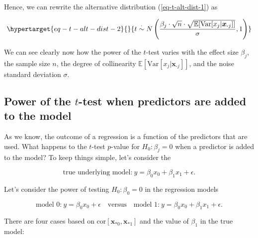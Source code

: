 \documentclass[
  11pt,
  letterpaper,
  oneside]{book}
\theoremstyle{plain}
\theoremstyle{plain}
\theoremstyle{definition}
\theoremstyle{definition}
\theoremstyle{plain}
\theoremstyle{remark}
\begin{document}
Hence, we can rewrite the alternative distribution
(\ref{eq-t-alt-dist-1}) as

\begin{equation}\protect\hypertarget{eq-t-alt-dist-2}{}{
t \overset{\cdot}{\sim} N\left(\frac{\beta_j \cdot \sqrt{n} \cdot \sqrt{\mathbb{E}[\text{Var}[x_j|\boldsymbol{x}_{\text{-}j}]]}}{\sigma}, 1\right)
}\label{eq-t-alt-dist-2}\end{equation}

We can see clearly now how the power of the \(t\)-test varies with the
effect size \(\beta_j\), the sample size \(n\), the degree of
collinearity \(\mathbb{E}[\text{Var}[x_j|\boldsymbol{x}_{\text{-}j}]]\),
and the noise standard deviation \(\sigma\).

\hypertarget{power-of-the-t-test-when-predictors-are-added-to-the-model}{%
\subsection{\texorpdfstring{Power of the \(t\)-test when predictors are
added to the
model}{Power of the t-test when predictors are added to the model}}\label{power-of-the-t-test-when-predictors-are-added-to-the-model}}

As we know, the outcome of a regression is a function of the predictors
that are used. What happens to the \(t\)-test \(p\)-value for
\(H_0: \beta_j = 0\) when a predictor is added to the model? To keep
things simple, let's consider the

\[
\text{true underlying model:}\ y = \beta_0 x_0 + \beta_1 x_1 + \epsilon.
\]

Let's consider the power of testing \(H_0: \beta_0 = 0\) in the
regression models

\[
\text{model 0:}\ y = \beta_0 x_0 + \epsilon \quad \text{versus} \quad \text{model 1:}\ y = \beta_0 x_0 + \beta_1 x_1 + \epsilon.
\]

There are four cases based on
\(\text{cor}[\boldsymbol{x}_{*0}, \boldsymbol{x}_{*1}]\) and the value
of \(\beta_1\) in the true model:
\end{document}
